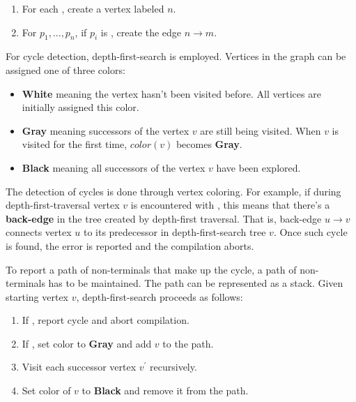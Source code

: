 \begin{enumerate}
\item
For each \NtDefinitionN[n], create a vertex  labeled $n$.
\item
For $p_1, ..., p_n$, if $p_i$ is \NtDefinitionN[m], create the edge $n\rightarrow m$.
\end{enumerate}


For cycle detection, depth-first-search is employed. Vertices in the graph can be assigned one of three colors:

\begin{itemize}
\item

\textbf{White} meaning the vertex hasn't been visited before. All vertices are initially assigned this color.

\item
\textbf{Gray} meaning successors of the vertex $v$ are still being visited. When $v$ is visited for the first time, $color(v)$ becomes \textbf{Gray}.
\item
\textbf{Black} meaning all successors of the vertex $v$ have been explored. 
\end{itemize}



The detection of cycles is done through vertex coloring. For example, if during depth-first-traversal vertex $v$ is encountered with , this means that there's a \textbf{back-edge} in the tree created by depth-first traversal. That is, back-edge $u \rightarrow v$ connects vertex $u$ to its predecessor in depth-first-search tree $v$. Once such cycle is found, the error is reported and the compilation aborts.

To report a path of non-terminals that make up the cycle, a path of non-terminals has to be maintained. The path can be represented as a stack. Given starting vertex $v$, depth-first-search proceeds as follows:

\begin{enumerate}
\item If , report cycle and abort compilation.
\item If , set color to \textbf{Gray} and add $v$ to the path. 
\item Visit each successor vertex $v^{\prime}$ recursively.
\item Set color of $v$ to \textbf{Black} and remove it from the path.
\end{enumerate}

